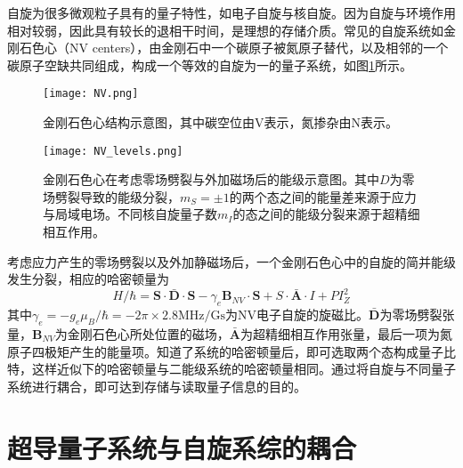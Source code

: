             自旋为很多微观粒子具有的量子特性，如电子自旋与核自旋。因为自旋与环境作用相对较弱，因此具有较长的退相干时间，是理想的存储介质。常见的自旋系统如金刚石色心（NV centers），由金刚石中一个碳原子被氮原子替代，以及相邻的一个碳原子空缺共同组成，构成一个等效的自旋为一的量子系统，如图\ref{fig:NV_centers}所示。

            \begin{figure}[h]
                \centering
                \texttt{[image: NV.png]}
                \caption{金刚石色心结构示意图，其中碳空位由V表示，氮掺杂由N表示\cite{grezes2016towards}。}
                \label{fig:NV_centers}
            \end{figure}%

            \begin{figure}[h]
                \centering
                \texttt{[image: NV\_levels.png]}
                \caption{金刚石色心在考虑零场劈裂与外加磁场后的能级示意图。其中$D$为零场劈裂导致的能级分裂，$m_S = \pm1$的两个态之间的能量差来源于应力与局域电场。不同核自旋量子数$m_I$的态之间的能级分裂来源于超精细相互作用\cite{grezes2016towards}。}
                \label{fig:NV_levels}
            \end{figure}

            考虑应力产生的零场劈裂以及外加静磁场后，一个金刚石色心中的自旋的简并能级发生分裂，相应的哈密顿量为\cite{grezes2016towards}
            \begin{equation}
            \label{eqn:NV_hamiltonian}
                H/\hbar = \bm S \cdot \bar{\bm D} \cdot \bm S - \gamma_e \bm B_{NV} \cdot \bm S + S \cdot \bar{\bm A}\cdot I +P I_Z^2
            \end{equation}
            其中$ \gamma_e = -g_e \mu_B /\hbar = -2\pi \times 2.8 \mathrm{MHz/Gs} $为NV电子自旋的旋磁比。$\bar{\bm D} $为零场劈裂张量，$\bm B_{NV} $为金刚石色心所处位置的磁场，$\bar{\bm A}$为超精细相互作用张量，最后一项为氮原子四极矩产生的能量项。知道了系统的哈密顿量后，即可选取两个态构成量子比特，这样近似下的哈密顿量与二能级系统的哈密顿量相同。通过将自旋与不同量子系统进行耦合，即可达到存储与读取量子信息的目的。
            




            

        \section{超导量子系统与自旋系综的耦合} %
        \label{sec:simulation_experimental_works}

